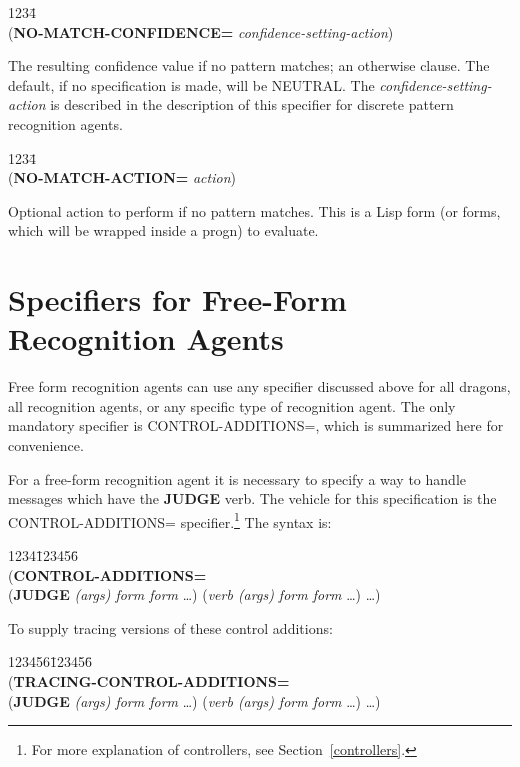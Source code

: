 \begin{tabbing}
1234\= \kill
\\
({\bf NO-MATCH-CONFIDENCE=} {\it confidence-setting-action\/})\\
\end{tabbing}
The resulting confidence value if no pattern matches; an otherwise
clause.  The default, if no specification is made, will be NEUTRAL.
The {\it confidence-setting-action} is described in the description of
this specifier for discrete pattern recognition agents.

\begin{tabbing}
1234\= \kill
\\
({\bf NO-MATCH-ACTION=} {\it action\/})\\
\end{tabbing}
Optional action to perform if no pattern matches. This is a Lisp form
(or forms, which will be wrapped inside a progn) to evaluate.





\section{Specifiers for Free-Form Recognition Agents}

Free form recognition agents can use any specifier discussed above for
all dragons, all recognition agents, or any specific type of
recognition agent. The only mandatory specifier is CONTROL-ADDITIONS=,
which is summarized here for convenience.

For a free-form recognition agent it is necessary to specify a way to
handle messages which have the {\bf JUDGE} verb.  The vehicle for this
specification is the CONTROL-ADDITIONS= specifier.\footnote{For more
explanation of controllers, see Section~\ref{controllers}.} The syntax
is:

\begin{tabbing}
1234\=123456\= \kill
\\
({\bf CONTROL-ADDITIONS=} \\
\>\>({\bf JUDGE} {\it (args) form form\/} \ldots)
({\it verb (args) form form\/} \ldots) \ldots)
\\
\end{tabbing}
To supply tracing versions of these control additions:
\begin{tabbing}
123456\=123456\= \kill
\\
({\bf TRACING-CONTROL-ADDITIONS=} \\
\>\>({\bf JUDGE} {\it (args) form form\/} \ldots)
({\it verb (args) form form\/} \ldots) \ldots)
\end{tabbing}


